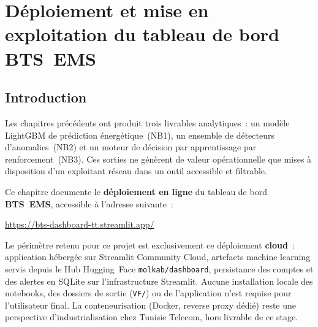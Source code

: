 
\chapter{Déploiement et mise en exploitation du tableau de bord BTS~EMS}
\label{chap:deploiement}

\section{Introduction}
\label{sec:dep-intro}

Les chapitres précédents ont produit trois livrables analytiques~: un modèle
LightGBM de prédiction énergétique~(NB1), un ensemble de détecteurs
d'anomalies~(NB2) et un moteur de décision par apprentissage par renforcement~(NB3).
Ces sorties ne génèrent de valeur opérationnelle que mises à disposition d'un
exploitant réseau dans un outil accessible et filtrable.

Ce chapitre documente le \textbf{déploiement en ligne} du tableau de bord
\textbf{BTS~EMS}, accessible à l'adresse suivante~:
\begin{center}
  \url{https://bts-dashboard-tt.streamlit.app/}
\end{center}

Le périmètre retenu pour ce projet est exclusivement ce déploiement
\textbf{cloud}~: application hébergée sur Streamlit Community Cloud, artefacts
machine learning servis depuis le Hub Hugging~Face \texttt{molkab/dashboard},
persistance des comptes et des alertes en SQLite sur l'infrastructure Streamlit.
Aucune installation locale des notebooks, des dossiers de sortie (\texttt{VF/})
ou de l'application n'est requise pour l'utilisateur final. La conteneurisation
(Docker, reverse proxy dédié) reste une perspective d'industrialisation chez
Tunisie Telecom, hors livrable de ce stage.


